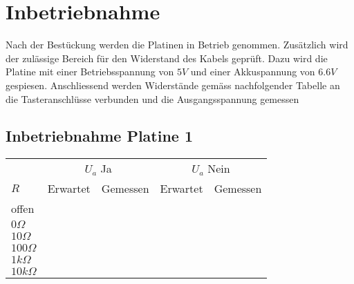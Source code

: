 
\section{Inbetriebnahme}
Nach der Bestückung werden die Platinen in Betrieb genommen. Zusätzlich wird 
der zulässige Bereich für den Widerstand des Kabels geprüft. Dazu wird die 
Platine mit einer Betriebsspannung von $5 V$ und einer Akkuspannung von $6.6 V$ 
gespiesen. Anschliessend werden Widerstände gemäss nachfolgender Tabelle an die 
Tasteranschlüsse verbunden und die Ausgangsspannung gemessen

\subsection{Inbetriebnahme Platine 1}
\begin{tabular}{@{}lllll}
                & \multicolumn{2}{c}{$U_a$ Ja}  & \multicolumn{2}{c}{$U_a$ Nein} \\
  $R$           & Erwartet  & Gemessen  & Erwartet  & Gemessen  \\
  offen         &           &           &           &           \\
  $0 \Omega$    &           &           &           &           \\
  $10 \Omega$   &           &           &           &           \\
  $100 \Omega$  &           &           &           &           \\
  $1 k\Omega$   &           &           &           &           \\
  $10 k\Omega$  &           &           &           &           \\
\end{tabular}